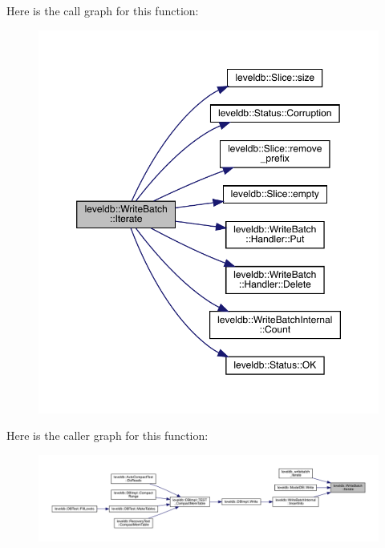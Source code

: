 Here is the call graph for this function\+:
\nopagebreak
\begin{figure}[H]
\begin{center}
\leavevmode
\includegraphics[width=350pt]{classleveldb_1_1_write_batch_a64278020155c37619bfe007840bb2d23_cgraph}
\end{center}
\end{figure}
Here is the caller graph for this function\+:
\nopagebreak
\begin{figure}[H]
\begin{center}
\leavevmode
\includegraphics[width=350pt]{classleveldb_1_1_write_batch_a64278020155c37619bfe007840bb2d23_icgraph}
\end{center}
\end{figure}
\mbox{\label{classleveldb_1_1_write_batch_a049aee5405c91cb9e56bd26bd098f51d}} 
